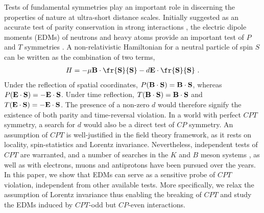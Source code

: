 \documentclass[prl,twocolumn,tightenlines,preprintnumbers,floatfix,nofootinbib]{revtex4}
\def\ba{\begin{eqnarray}}
\def\ea{\end{eqnarray}}
\begin{document}

Tests of fundamental symmetries play an important 
role in discerning the properties of nature at 
ultra-short distance scales. Initially suggested as 
an accurate test of parity conservation in strong interactions 
\cite{PR}, the electric dipole moments (EDMs) of neutrons and heavy atoms 
provide an important test of $P$ and $T$ symmetries \cite{exp,KL,PRann}. 
A non-relativistic Hamiltonian for a neutral particle of spin 
$S$ can be written as the combination of two terms,
\ba
 H = - \mu {\bf B} \cdot \fr{\bf{S}}{S} - d {\bf E} \cdot \fr{\bf{S}}{S}\ .
\label{starting}
\ea
Under the reflection of spatial coordinates, $P({\bf B} \cdot \bf{S})= {\bf B} \cdot \bf{S}$, 
whereas $P({\bf E} \cdot \bf{S})= -{\bf E} \cdot \bf{S}$. Under time reflection, 
$T({\bf B} \cdot \bf{S})= {\bf B} \cdot \bf{S}$ and 
$T({\bf E} \cdot \bf{S})= -{\bf E} \cdot \bf{S}$. The presence of a non-zero $d$
would therefore signify the existence of both parity and time-reversal
violation. In a world with perfect $CPT$ symmetry, a search for $d$ would also 
be a direct test of $CP$ symmetry. 
An assumption of $CPT$ is well-justified 
in the field theory framework, as it rests on locality, spin-statistics and
Lorentz invariance. Nevertheless, independent tests of $CPT$ are warranted, and a
number of searches in the $K$ and $B$ meson systems \cite{K_CPT},
as well as with electrons, muons and antiprotons have been pursued over the years. 
In this paper, we show that EDMs can serve as a sensitive 
probe of $CPT$ violation, independent from other available tests.
More specifically, we  relax the assumption of Lorentz invariance 
thus enabling the breaking of $CPT$ and study the 
EDMs induced by $CPT$-odd but $CP$-even interactions. 
\end{document}
